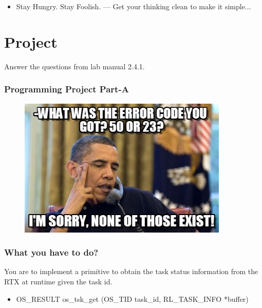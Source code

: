 \documentclass[serif,mathserif]{beamer}
\begin{document}
\begin{frame}
  \begin{itemize}
  
  
      \item Stay Hungry. Stay Foolish. --- Get your thinking clean to make it simple...
      
  \end{itemize}
\end{frame}



 \section{Project} %
 
 

\begin{frame}
  Answer the questions from lab manual 2.4.1.
\end{frame}

\begin{frame}
  \frametitle{Programming Project Part-A}
  \begin{figure}
    \centering
    \includegraphics[width=10cm]{abc.jpg}
  \end{figure}
\end{frame}


\begin{frame}
   \frametitle{What you have to do?}
   You are to implement a primitive to obtain
the task status information from the RTX at runtime given the task id.

\begin{itemize}
    \item  OS\_RESULT  os\_tsk\_get (OS\_TID task\_id, RL\_TASK\_INFO *buffer)
\end{itemize}
\end{frame}
\end{document}
